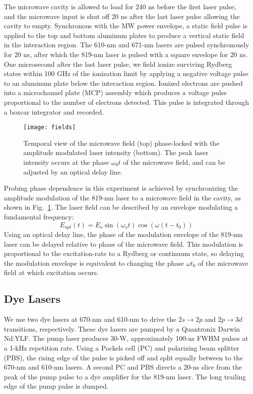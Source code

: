 \documentclass[aps,pra,preprint,groupedaddress]{revtex4-1}
\begin{document}
The microwave cavity is allowed to load for 240 ns before the first laser pulse, and the microwave input is shut off 20 ns after the last laser pulse allowing the cavity to empty. Synchronous with the MW power envelope, a static field pulse is applied to the top and bottom aluminum plates to produce a vertical static field in the interaction region. The 610-nm and 671-nm lasers are pulsed synchronously for 20 ns, after which the 819-nm laser is pulsed with a square envelope for 20 ns. One microsecond after the last laser pulse, we field ionize surviving Rydberg states within 100 GHz of the ionization limit by applying a negative voltage pulse to an aluminum plate below the interaction region. Ionized electrons are pushed into a microchannel plate (MCP) assembly which produces a voltage pulse proportional to the number of electrons detected. This pulse is integrated through a boxcar integrator and recorded.

\begin{figure}
	\texttt{[image: fields]}
	\caption{Temporal view of the microwave field (top) phase-locked with the amplitude modulated laser intensity (bottom). The peak laser intensity occurs at the phase $\omega_0 t$ of the microwave field, and can be adjusted by an optical delay line.}
	\label{fig:AMLaser}
\end{figure}

Probing phase dependence in this experiment is achieved by synchronizing the amplitude modulation of the 819-nm laser to a microwave field in the cavity, as shown in Fig.~\ref{fig:AMLaser}. The laser field can be described by an envelope modulating a fundamental frequency:
\begin{equation}
E_{opt}(t) = E_o \sin{(\omega_o t)} \cos{(\omega(t-t_0))}
\end{equation}
Using an optical delay line, the phase of the modulation envelope of the 819-nm laser can be delayed relative to phase of the microwave field. This modulation is proportional to the excitation-rate to a Rydberg or continuum state, so delaying the modulation envelope is equivalent to changing the phase $\omega t_0$ of the microwave field at which excitation occurs.

\subsection{Dye Lasers}
\label{sec:dye}

We use two dye lasers at 670-nm and 610-nm to drive the $2s \rightarrow 2p$ and $2p \rightarrow 3d$ transitions, respectively. These dye lasers are pumped by a Quantronix Darwin Nd:YLF. The pump laser produces 30-W, approximately 100-ns FWHM pulses at a 1-kHz repetition rate. Using a Pockels cell (PC) and polarizing beam splitter (PBS), the rising edge of the pulse is picked off and split equally between to the 670-nm and 610-nm lasers. A second PC and PBS directs a 20-ns slice from the peak of the pump pulse to a dye amplifier for the 819-nm laser. The long trailing edge of the pump pulse is dumped.
\end{document}

